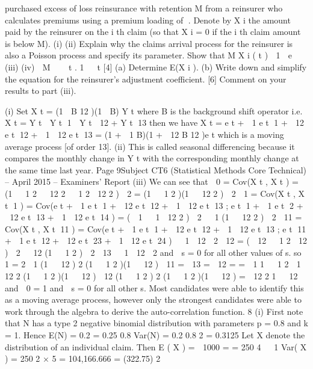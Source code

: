 \documentclass[a4paper,12pt]{article}
\begin{document}
\begin{enumerate}
purchased excess of loss reinsurance with retention M from a reinsurer who calculates
premiums using a premium loading of . Denote by X i the amount paid by the
reinsurer on the i th claim (so that X i = 0 if the i th claim amount is below M).
(i)
(ii)
Explain why the claims arrival process for the reinsurer is also a Poisson
process and specify its parameter.
Show that
M X i ( t )  1  e
(iii)
(iv)
 M


 t
.
1   t
[4]
(a) Determine E(X i ).
(b) Write down and simplify the equation for the reinsurer’s adjustment
coefficient.
[6]
Comment on your results to part (iii).

(i)
Set X t = (1  B 12 )(1  B) Y t where B is the background shift operator
i.e. X t = Y t  Y t 1  Y t  12 + Y t 13
then we have X t = e t +  1 e t 1 +  12 e t 12 +  1  12 e t 13
= (1 +  1 B)(1 +  12 B 12 )e t
which is a moving average process [of order 13].
(ii)
This is called seasonal differencing because it compares the monthly change in
Y t with the corresponding monthly change at the same time last year.
Page 9Subject CT6 (Statistical Methods Core Technical) – April 2015 – Examiners’ Report
(iii)
We can see that
 0 = Cov(X t , X t ) = (1   1 2   12 2   1 2  12 2 )  2 = (1   1 2 )(1   12 2 )  2
 1 = Cov(X t , X t 1 ) = Cov(e t +  1 e t 1 +  12 e t 12 +  1  12 e t 13 ;
e t 1 +  1 e t 2 +  12 e t 13 +  1  12 e t 14 )
= (  1   1  12 2 )  2   1 (1   12 2 )  2
 11 = Cov(X t , X t 11 ) = Cov(e t +  1 e t 1 +  12 e t 12 +  1  12 e t 13 ;
e t 11 +  1 e t 12 +  12 e t 23 +  1  12 e t 24 )
  1  12  2
 12 = (  12   1 2  12 )  2   12 (1   1 2 )  2
 13   1  12  2
and  s = 0 for all other values of s.
so  1 =
2
 1 (1   12
)
2
(1   1 2 )(1   12
)
 11 =  13 =
 12 =
=
 1
1   1 2
 1  12
2
(1   1 2 )(1   12
)
 12 (1   1 2 )
2
(1   1 2 )(1   12
)
=
 12
2
1   12
and  0 = 1 and  s = 0 for all other s.
Most candidates were able to identify this as a moving average process, however only the
strongest candidates were able to work through the algebra to derive the auto-correlation
function.
8
(i)
First note that N has a type 2 negative binomial distribution with parameters
p = 0.8 and k = 1. Hence
E(N) =
0.2
= 0.25
0.8
Var(N) =
0.2
0.8 2
= 0.3125
Let X denote the distribution of an individual claim. Then
E ( X ) =

1000
=
= 250
4
  1
Var( X ) = 250 2 ×
5
= 104,166.666 = (322.75) 2

\end{enumerate}
\end{document}
